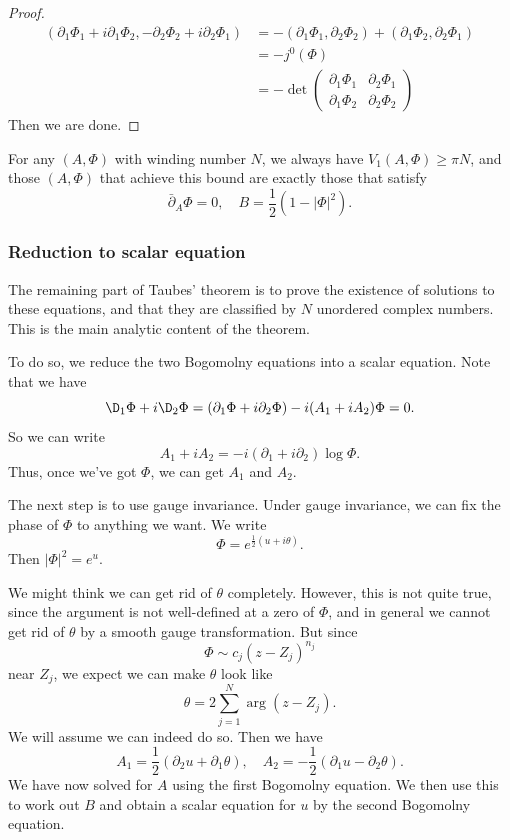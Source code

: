 \documentclass[a4paper]{article}
\begin{document}
\begin{proof}
  \begin{align*}
    (\partial_1 \Phi_1 + i \partial_1 \Phi_2, - \partial_2 \Phi_2 + i \partial_2 \Phi_1) &= - (\partial_1 \Phi_1, \partial_2 \Phi_2) + (\partial_1 \Phi_2, \partial_2 \Phi_1)\\
    &= -j^0(\Phi)\\
    &= - \det
    \begin{pmatrix}
      \partial_1 \Phi_1 & \partial_2 \Phi_1\\
      \partial_1 \Phi_2 & \partial_2 \Phi_2
    \end{pmatrix}
  \end{align*}
  Then we are done.
\end{proof}

\begin{cor}
  For any $(A, \Phi)$ with winding number $N$, we always have $V_1(A, \Phi) \geq \pi N$, and those $(A, \Phi)$ that achieve this bound are exactly those that satisfy
  \[
    \bar{\partial}_A \Phi = 0,\quad B = \frac{1}{2} (1 - |\Phi|^2).
  \]
\end{cor}

\subsubsection*{Reduction to scalar equation}
The remaining part of Taubes' theorem is to prove the existence of solutions to these equations, and that they are classified by $N$ unordered complex numbers. This is the main analytic content of the theorem.

To do so, we reduce the two Bogomolny equations into a scalar equation. Note that we have
\[
  \D_1 \Phi + i \D_2 \Phi = (\partial_1 \Phi + i \partial_2 \Phi) - i (A_1 + i A_2) \Phi = 0.
\]
So we can write
\[
  A_1 + i A_2 = - i (\partial_1 + i \partial_2) \log \Phi.
\]
Thus, once we've got $\Phi$, we can get $A_1$ and $A_2$.

The next step is to use gauge invariance. Under gauge invariance, we can fix the phase of $\Phi$ to anything we want. We write
\[
  \Phi = e^{\frac{1}{2} (u + i \theta)}.
\]
Then $|\Phi|^2 = e^u$.

We might think we can get rid of $\theta$ completely. However, this is not quite true, since the argument is not well-defined at a zero of $\Phi$, and in general we cannot get rid of $\theta$ by a smooth gauge transformation. But since
\[
  \Phi \sim c_j (z - Z_j)^{n_j}
\]
near $Z_j$, we expect we can make $\theta$ look like
\[
  \theta = 2 \sum_{j = 1}^N \arg (z - Z_j).
\]
We will assume we can indeed do so. Then we have
\[
  A_1 = \frac{1}{2}(\partial_2 u + \partial_1 \theta),\quad A_2 = - \frac{1}{2} (\partial_1 u - \partial_2 \theta).
\]
We have now solved for $A$ using the first Bogomolny equation. We then use this to work out $B$ and obtain a scalar equation for $u$ by the second Bogomolny equation.
\end{document}
